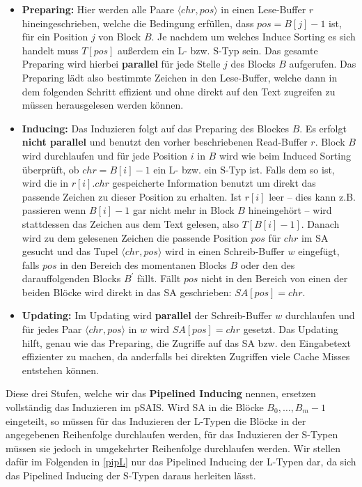 \begin{itemize}
\item \textbf{Preparing:} Hier werden alle Paare $\langle chr, pos \rangle$ in einen Lese-Buffer $r$ hineingeschrieben, welche die Bedingung erfüllen, dass $pos = B[j]-1$ ist, für ein Position $j$ von Block $B$. Je nachdem um welches Induce Sorting es sich handelt muss $T[pos]$ außerdem ein L- bzw. S-Typ sein. Das gesamte Preparing wird hierbei \textbf{parallel} für jede Stelle $j$ des Blocks $B$ aufgerufen. Das Preparing lädt also bestimmte Zeichen in den Lese-Buffer, welche dann in dem folgenden Schritt effizient und ohne direkt auf den Text zugreifen zu müssen herausgelesen werden können.

\item \textbf{Inducing:} Das Induzieren folgt auf das Preparing des Blockes $B$. Es erfolgt \textbf{nicht parallel} und benutzt den vorher beschriebenen Read-Buffer $r$. Block $B$ wird durchlaufen und für jede Position $i$ in $B$ wird wie beim Induced Sorting überprüft, ob $chr = B[i]-1$ ein L- bzw. ein S-Typ ist. Falls dem so ist, wird die in $r[i].chr$ gespeicherte Information benutzt um direkt das passende Zeichen zu dieser Position zu erhalten. Ist $r[i]$ leer -- dies kann z.B. passieren wenn $B[i]-1$ gar nicht mehr in Block $B$ hineingehört -- wird stattdessen das Zeichen aus dem Text gelesen, also $T[B[i]-1]$. Danach wird zu dem gelesenen Zeichen die passende Position $pos$ für $chr$ im SA gesucht und das Tupel $\langle chr, pos \rangle$ wird in einen Schreib-Buffer $w$ eingefügt, falls $pos$ in den Bereich des momentanen Blocks $B$ oder den des darauffolgenden Blocks $B^\prime$ fällt. Fällt $pos$ nicht in den Bereich von einen der beiden Blöcke wird direkt in das SA geschrieben: $SA[pos] = chr$.

\item \textbf{Updating:} Im Updating wird \textbf{parallel} der Schreib-Buffer $w$ durchlaufen und für jedes Paar $\langle chr, pos \rangle$ in $w$ wird $SA[pos] = chr$ gesetzt. Das Updating hilft, genau wie das Preparing, die Zugriffe auf das SA bzw. den Eingabetext effizienter zu machen, da anderfalls bei direkten Zugriffen viele Cache Misses entstehen können.
\end{itemize}

Diese drei Stufen, welche wir das \textbf{Pipelined Inducing} nennen, ersetzen vollständig das Induzieren im pSAIS. Wird SA in die Blöcke $B_0, \ldots, B_m-1$ eingeteilt, so müssen für das Induzieren der L-Typen die Blöcke in der angegebenen Reihenfolge durchlaufen werden, für das Induzieren der S-Typen müssen sie jedoch in umgekehrter Reihenfolge durchlaufen werden. Wir stellen dafür im Folgenden in \ref{pipL} nur das Pipelined Inducing der L-Typen dar, da sich das Pipelined Inducing der S-Typen daraus herleiten lässt.

